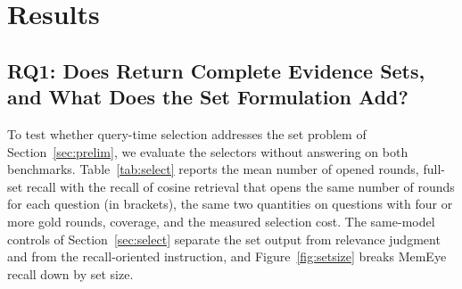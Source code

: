 \section{Results}
\label{sec:results}

\subsection{RQ1: Does \qss{} Return Complete Evidence Sets, and What Does the Set Formulation Add?}
\label{sec:rq1}

To test whether query-time selection addresses the set problem of Section~\ref{sec:prelim}, we evaluate the selectors without answering on both benchmarks. Table~\ref{tab:select} reports the mean number of opened rounds, full-set recall with the recall of cosine retrieval that opens the same number of rounds for each question (in brackets), the same two quantities on questions with four or more gold rounds, coverage, and the measured selection cost. The same-model controls of Section~\ref{sec:select} separate the set output from relevance judgment and from the recall-oriented instruction, and Figure~\ref{fig:setsize} breaks MemEye recall down by set size.


